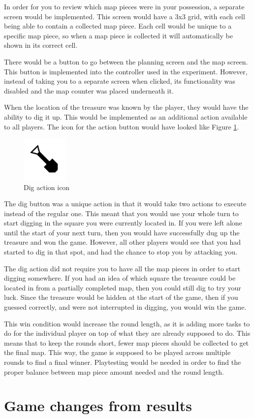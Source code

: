 In order for you to review which map pieces were in your possession, a separate screen would be implemented. This screen would have a 3x3 grid, with each cell being able to contain a collected map piece. Each cell would be unique to a specific map piece, so when a map piece is collected it will automatically be shown in its correct cell.

There would be a button to go between the planning screen and the map screen. This button is implemented into the controller used in the experiment. However, instead of taking you to a separate screen when clicked, its functionality was disabled and the map counter was placed underneath it.

When the location of the treasure was known by the player, they would have the ability to dig it up. This would be implemented as an additional action available to all players. The icon for the action button would have looked like Figure \ref{fig:dig}.

\begin{figure}[h!]
	\centering
	\includegraphics[width=0.2\textwidth]{figures/dig.png}
	\caption{Dig action icon \label{fig:dig}}
\end{figure}

The dig button was a unique action in that it would take two actions to execute instead of the regular one. This meant that you would use your whole turn to start digging in the square you were currently located in. If you were left alone until the start of your next turn, then you would have successfully dug up the treasure and won the game. However, all other players would see that you had started to dig in that spot, and had the chance to stop you by attacking you.

The dig action did not require you to have all the map pieces in order to start digging somewhere. If you had an idea of which square the treasure could be located in from a partially completed map, then you could still dig to try your luck. Since the treasure would be hidden at the start of the game, then if you guessed correctly, and were not interrupted in digging, you would win the game.

This win condition would increase the round length, as it is adding more tasks to do for the individual player on top of what they are already supposed to do. This means that to keep the rounds short, fewer map pieces should be collected to get the final map. This way, the game is supposed to be played across multiple rounds to find a final winner. Playtesting would be needed in order to find the proper balance between map piece amount needed and the round length.

\section{Game changes from results}\label{sec:changes_from_results}
